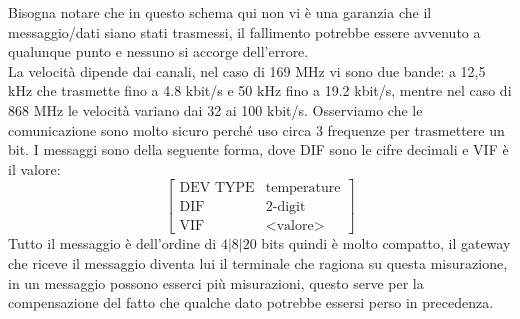 \documentclass[11pt, twocolumn]{article}
\begin{document}
Bisogna notare che in questo schema qui non vi è una garanzia che il messaggio/dati siano stati trasmessi, il fallimento potrebbe essere avvenuto a qualunque punto e nessuno si accorge dell'errore.\\
La velocità dipende dai canali, nel caso di 169 MHz vi sono due bande: a 12,5 kHz che trasmette fino a 4.8 kbit/s e 50 kHz fino a 19.2 kbit/s, mentre nel caso di 868 MHz le velocità variano dai 32 ai 100 kbit/s.
Osserviamo che le comunicazione sono molto sicuro perché uso circa 3 frequenze per trasmettere un bit.
I messaggi sono della seguente forma, dove DIF sono le cifre decimali e VIF è il valore:
\[
\begin{bmatrix}
  \text{DEV TYPE} & \text{temperature}\\
  \text{DIF} & \text{2-digit}\\
  \text{VIF} & \text{<valore>}
\end{bmatrix}
\]
Tutto il messaggio è dell'ordine di $4|8|20$ bits quindi è molto compatto, il gateway che riceve il messaggio diventa lui il terminale che ragiona su questa misurazione, in un messaggio possono esserci più misurazioni, questo serve per la compensazione del fatto che qualche dato potrebbe essersi perso in precedenza.
\end{document}
